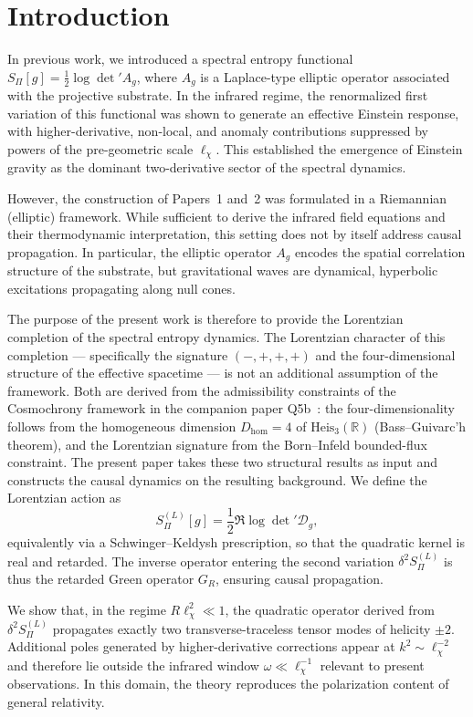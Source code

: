 \section{Introduction}

  In previous work, we introduced a spectral entropy functional
  $S_\Pi[g] = \tfrac12 \log \det{}' A_g$,
  where $A_g$ is a Laplace-type elliptic operator associated with the
  projective substrate.
  In the infrared regime, the renormalized first variation of this functional
  was shown to generate an effective Einstein response, with higher-derivative,
  non-local, and anomaly contributions suppressed by powers of the
  pre-geometric scale $\ell_\chi$.
  This established the emergence of Einstein gravity as the dominant
  two-derivative sector of the spectral dynamics.

  However, the construction of Papers~1 and~2 was formulated in a
  Riemannian (elliptic) framework.
  While sufficient to derive the infrared field equations and their
  thermodynamic interpretation, this setting does not by itself address
  causal propagation.
  In particular, the elliptic operator $A_g$ encodes the spatial
  correlation structure of the substrate, but gravitational waves are
  dynamical, hyperbolic excitations propagating along null cones.

  The purpose of the present work is therefore to provide the
  Lorentzian completion of the spectral entropy dynamics.
  The Lorentzian character of this completion — specifically the
  signature $(-,+,+,+)$ and the four-dimensional structure of the
  effective spacetime — is not an additional assumption of the framework.
  Both are derived from the admissibility constraints of the Cosmochrony
  framework in the companion paper Q5b~\cite{Beau2026q5b}: the
  four-dimensionality follows from the homogeneous dimension
  $D_{\mathrm{hom}} = 4$ of $\mathrm{Heis}_3(\mathbb{R})$
  (Bass--Guivarc'h theorem), and the Lorentzian signature from the
  Born--Infeld bounded-flux constraint.
  The present paper takes these two structural results as input and
  constructs the causal dynamics on the resulting background.
  We define the Lorentzian action as
  \[
    S_\Pi^{(L)}[g]
    =
    \frac12 \Re \log \det{}' \mathcal{D}_g,
  \]
  equivalently via a Schwinger--Keldysh prescription,
  so that the quadratic kernel is real and retarded.
  The inverse operator entering the second variation
  $\delta^2 S_\Pi^{(L)}$ is thus the retarded Green operator $G_R$,
  ensuring causal propagation.

  We show that, in the regime
  $R\ell_\chi^2 \ll 1$,
  the quadratic operator derived from
  $\delta^2 S_\Pi^{(L)}$
  propagates exactly two transverse-traceless tensor modes of helicity
  $\pm 2$.
  Additional poles generated by higher-derivative corrections appear at
  $k^2 \sim \ell_\chi^{-2}$ and therefore lie outside the infrared
  window $\omega \ll \ell_\chi^{-1}$ relevant to present observations.
  In this domain, the theory reproduces the polarization content of
  general relativity.

